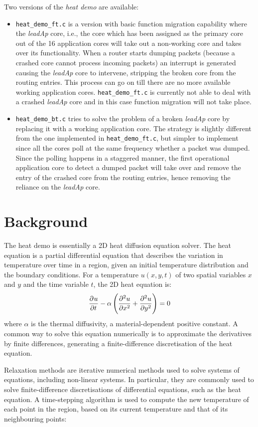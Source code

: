 \documentclass[oneside, a4paper, 11pt]{memoir}
\begin{document}
Two versions of the \emph{heat demo} are available:
\begin{itemize}
\item \verb|heat_demo_ft.c| is a version with basic function migration capability where the \emph{leadAp} core, i.e., the core which has been assigned as the primary core out of the 16 application cores will take out a non-working core and takes over its functionality. When a router starts dumping packets (because a crashed core cannot process incoming packets) an interrupt is generated causing the \emph{leadAp} core to intervene, stripping the broken core from the routing entries. This process can go on till there are no more available working application cores. \verb|heat_demo_ft.c| is currently not able to deal with a crashed \emph{leadAp} core and in this case function migration will not take place.

\item \verb|heat_demo_bt.c| tries to solve the problem of a broken \emph{leadAp} core by replacing it with a working application core. The strategy is slightly different from the one implemented in \verb|heat_demo_ft.c|, but simpler to implement since all the cores poll at the same frequency whether a packet was dumped. Since the polling happens in a staggered manner, the first operational application core to detect a dumped packet will take over and remove the entry of the crashed core from the routing entries, hence removing the reliance on the \emph{leadAp} core.
\end{itemize}

\section{Background}
The heat demo is essentially a 2D heat diffusion equation solver. The heat equation is a partial differential equation that describes the variation in temperature over time in a region, given an initial temperature distribution and the boundary conditions. For a temperature $u(x,y,t)$ of two spatial variables $x$ and $y$ and the time variable $t$, the 2D heat equation is:
\[
\dpd{u}{t} -\alpha\left( \dpd[2]{u}{x} + \dpd[2]{u}{y} \right) = 0 
\]
where $\alpha$ is the thermal diffusivity, a material-dependent positive constant. A common way to solve this equation numerically is to approximate the derivatives by finite differences, generating a finite-difference discretisation of the heat equation.

Relaxation methods are iterative numerical methods used to solve systems of equations, including non-linear systems. In particular, they are commonly used to solve finite-difference discretisations of differential equations, such as the heat equation. A time-stepping algorithm is used to compute the new temperature of each point in the region, based on its current temperature and that of its neighbouring points:
\end{document}
